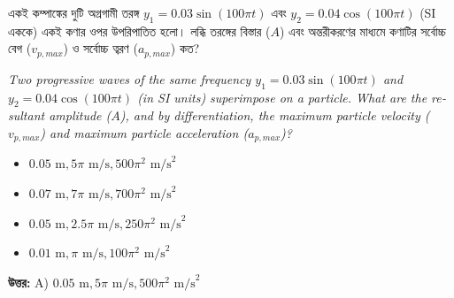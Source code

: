 \documentclass[12pt, a4paper]{article}
\begin{document}
\vspace{2em}

\begin{tcolorbox}[questionbox={প্রশ্ন (Question) 9}]
    \noindent
    একই কম্পাঙ্কের দুটি অগ্রগামী তরঙ্গ $y_1 = 0.03 \sin(100\pi t)$ এবং $y_2 = 0.04 \cos(100\pi t)$ (SI এককে) একই কণার ওপর উপরিপাতিত হলো। লব্ধি তরঙ্গের বিস্তার ($A$) এবং অন্তরীকরণের মাধ্যমে কণাটির সর্বোচ্চ বেগ ($v_{p,max}$) ও সর্বোচ্চ ত্বরণ ($a_{p,max}$) কত?
    
    \vspace{0.8em}
    \begin{english}
    \noindent\textit{\color{darkgray}
    Two progressive waves of the same frequency $y_1 = 0.03 \sin(100\pi t)$ and $y_2 = 0.04 \cos(100\pi t)$ (in SI units) superimpose on a particle. What are the resultant amplitude ($A$), and by differentiation, the maximum particle velocity ($v_{p,max}$) and maximum particle acceleration ($a_{p,max}$)?
    }
    \end{english}
\end{tcolorbox}

\begin{itemize}[label={}, leftmargin=1cm, itemsep=0.5em]
    \item[\textbf{A)}] $0.05\text{ m}, 5\pi\text{ m/s}, 500\pi^2\text{ m/s}^2$
    \item[\textbf{B)}] $0.07\text{ m}, 7\pi\text{ m/s}, 700\pi^2\text{ m/s}^2$
    \item[\textbf{C)}] $0.05\text{ m}, 2.5\pi\text{ m/s}, 250\pi^2\text{ m/s}^2$
    \item[\textbf{D)}] $0.01\text{ m}, \pi\text{ m/s}, 100\pi^2\text{ m/s}^2$
\end{itemize}

\vspace{0.5em}
\begin{tcolorbox}[answerbox]
    \textbf{\color{success} উত্তর:} A) $0.05\text{ m}, 5\pi\text{ m/s}, 500\pi^2\text{ m/s}^2$
\end{tcolorbox}
\vspace{1em}
\end{document}
